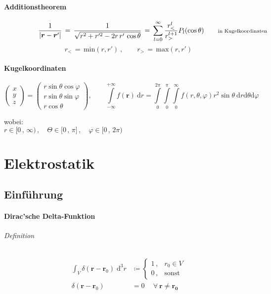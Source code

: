 \documentclass[titlepage,11pt,a4paper,ngerman]{report}
\renewcommand{\vec}[1]{\boldsymbol{#1}}
\renewcommand{\paragraph}[1]{\subsubsection{#1}}
\newcommand{\eq}{\,=\,}
\begin{document}
\paragraph{Additionstheorem}
\[\frac{1}{|\vec{r}-\vec{r}'|}\,=\,\frac{1}{\sqrt{r^2+r'^2-2r\,r'\,\cos\theta}}\,=\,\sum_{l=0}^{\infty}\frac{r_<^l}{r_>^{l+1}}P_l(\cos\theta)\qquad\rlap{\scriptsize{in Kugelkoordinaten}}\]
\[r_<\eq \mathrm{min}(r,r')\ ,\qquad r_>\eq \mathrm{max}(r,r')\]


\paragraph{Kugelkoordinaten}
$$
\begin{pmatrix}
	x \\ y\\ z
\end{pmatrix}
=
\begin{pmatrix}
	r \sin \theta \cos \varphi\\
	r \sin \theta \sin \varphi\\
	r \cos \theta
\end{pmatrix}
, \qquad \int\limits_{-\infty}^{+\infty} f(\vec{r})\ \textrm{d}r = \int\limits_{0}^{2 \pi} \int\limits_{0}^{\pi} \int\limits_{0}^{\infty} f(r,\theta,\varphi) r^2 \sin \theta\ \textrm{d}r \textrm{d}\theta \textrm{d}\varphi
$$

wobei:\\
$r\in \lbrack0\, ,\,\infty)\, ,\quad \Theta\in\lbrack 0\, ,\, \pi\rbrack\, , \quad \varphi\in\lbrack 0\, ,\, 2\pi) $


\chapter{Elektrostatik}

\section{Einführung}
\paragraph{Dirac'sche Delta-Funktion}
\subparagraph{Definition}

\begin{align*}
\int_{V} \delta(\vec{r}-\vec{r}_0) \; \text{d}^3r &\coloneqq
	\begin{cases} 
		1 \, , & r_0 \in V \\
		0 \, , & \text{sonst}
	\end{cases} \\
\delta(\vec{r}-\vec{r}_0) &= 0 \quad \ \forall \: \vec{r} \neq \vec{r_0}
\end{align*}
\end{document}
